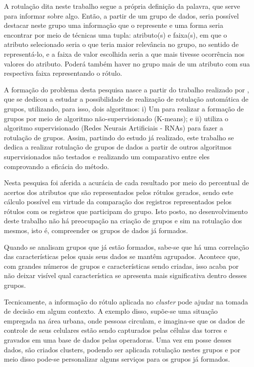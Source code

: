 A rotulação dita neste trabalho segue a própria definição da palavra, que serve para informar sobre algo. Então, a partir de um grupo de dados, seria possível destacar neste grupo uma informação que o represente e uma forma seria encontrar por meio de técnicas uma tupla: atributo(s) e faixa(s), em que o atributo selecionado seria o que teria maior relevância no grupo, no sentido de representá-lo, e a faixa de valor escolhida seria a que mais tivesse ocorrência nos valores do atributo. Poderá também haver no grupo mais de um atributo com sua respectiva faixa representando o rótulo. 



A formação do problema desta pesquisa nasce a partir do trabalho realizado por , que se dedicou a estudar a possibilidade de realização de rotulação automática de grupos, utilizando, para isso, dois algoritmos: i) Um para realizar a formação de grupos por meio de algoritmo não-supervisionado (K-means); e ii) utiliza o algoritmo supervisionado (Redes Neurais Artificiais - RNAs) para fazer a rotulação de grupos. Assim, partindo do estudo já realizado, este trabalho se dedica a realizar rotulação de grupos de dados a partir de outros algoritmos supervisionados não testados e realizando um comparativo entre eles comprovando a eficácia do método. 

Nesta pesquisa foi aferida a acurácia de cada resultado por meio do percentual de acertos dos atributos que são representados pelos rótulos gerados, sendo este cálculo possível em virtude da comparação dos registros representados pelos rótulos com os registros que participam do grupo. Isto posto, no desenvolvimento deste trabalho não há preocupação na criação de grupos e sim na rotulação dos mesmos, isto é, compreender os grupos de dados já formados. 


Quando se analisam grupos que já estão formados, sabe-se que há uma correlação das características pelos quais seus dados se mantêm agrupados. Acontece que, com grandes números de grupos e características sendo criadas, isso acaba por não deixar visível qual característica se apresenta mais significativa dentro desses grupos.


Tecnicamente, a informação do rótulo aplicada no \textit{cluster} pode ajudar na tomada de decisão em algum contexto. A exemplo disso, supõe-se uma situação empregada na área urbana, onde pessoas circulam, e imagina-se que os dados de controle de seus celulares estão sendo capturados pelas células das torres e gravados em uma base de dados pelas operadoras. Uma vez em posse desses dados, são criados clusters, podendo ser aplicada rotulação nestes grupos e por meio disso pode-se personalizar alguns serviços para os grupos já formados.

